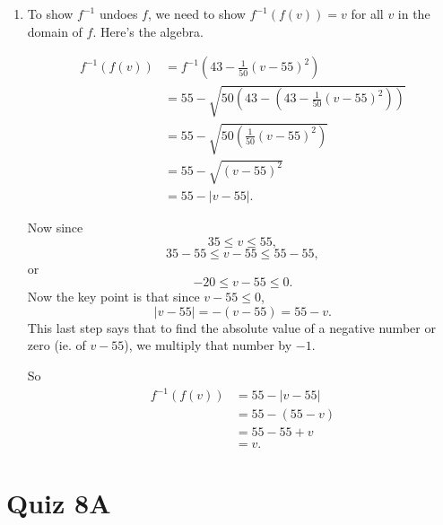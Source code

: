 \documentclass{ximera}
\begin{document}
\begin{question}
\begin{explanation}
\begin{enumerate}
\item To show $f^{-1}$ undoes $f$, we need to show $f^{-1}(f(v)) = v$ for all $v$ in the domain of $f$. Here's the algebra.

\begin{align*}
  f^{-1}(f(v)) &= f^{-1}( 43 - \frac{1}{50} \left( v-55 \right)^2 ) \\
                    &= 55 - \sqrt{50\left(43 - \left( 43 - \frac{1}{50} \left( v-55 \right)^2 \right)\right)} \\
                    &= 55 - \sqrt{50\left( \frac{1}{50}(v-55)^2  \right)} \\
                    &= 55 - \sqrt{(v-55)^2} \\
                     & = 55 - \left|v-55  \right| .
\end{align*}

Now since 
\[
  35\leq v \leq 55,
\]
\[
 35 - 55 \leq v - 55 \leq 55 - 55,
\]
or
\[
 -20 \leq v - 55 \leq 0.
\]
Now the key point is that since $v-55\leq 0$,
\[
 | v - 55 | = - (v-55) = 55-v .
\]
This last step says that to find the absolute value of a negative number or zero (ie. of $v-55$), we multiply that number by $-1$.

So
\begin{align*}
 f^{-1}(f(v)) &= 55 - \left|v-55  \right| \\
                   &= 55 - (55 -  v) \\
                  &=  55 -55 + v \\
                  &= v.
\end{align*}

\end{enumerate}
\end{explanation}
\end{question}


\section{Quiz 8A}
\end{document}
